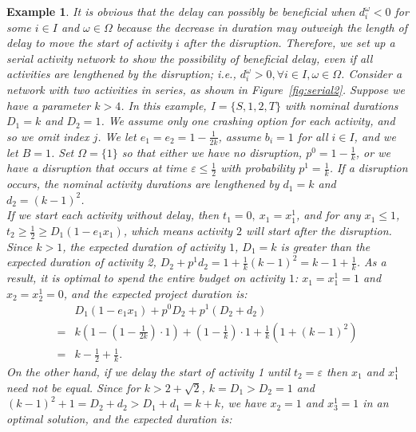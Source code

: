 \documentclass[11pt]{article}
\newtheorem{example}{Example}
\begin{document}
	\begin{example} \label{eg:delay}
		It is obvious that the delay can possibly be beneficial when \(d_i^\omega < 0\) for some \(i \in I\) and \(\omega \in \Omega\) because the decrease in duration may outweigh the length of delay to move the start of activity \(i\) after the disruption. Therefore, we set up a serial activity network to show the possibility of beneficial delay, even if all activities are lengthened by the disruption; i.e., \(d_i^\omega > 0, \forall i \in I, \omega \in \Omega\). Consider a network with two activities in series, as shown in Figure~\ref{fig:serial2}. Suppose we have a parameter \(k > 4\). In this example, $I=\{S,1,2,T\}$ with nominal durations $D_1 = k$ and $D_2 = 1$. We assume only one crashing option for each activity, and so we omit index $j$. We let $e_1=e_2=1 - \frac{1}{2k}$, assume $b_i=1$ for all $i \in I$, and we let $B=1$. Set $\Omega=\{1\}$ so that either we have no disruption, $p^0=1 - \frac{1}{k}$, or we have a disruption that occurs at time $\varepsilon \leq \frac{1}{2}$ with probability $p^1=\frac{1}{k}$. If a disruption occurs, the nominal activity durations are lengthened by $d_1 = k$ and $d_2 = (k - 1)^2$. \\
		\newline
		If we start each activity without delay, then \(t_1 = 0,\ x_1=x_1^1\), and for any \(x_1 \leq 1\), \(t_2 \geq \frac{1}{2} \geq D_1(1 - e_1 x_1) \), which means activity \(2\) will start after the disruption. Since \(k > 1\), the expected duration of activity \(1\), $D_1 = k$ is greater than the expected duration of activity 2, $ D_2 + p^1 d_2 = 1 + \frac{1}{k} (k-1)^2 = k - 1 + \frac{1}{k}$. As a result, it is optimal to spend the entire budget on activity \(1\): $x_1=x_1^1=1$ and $x_2=x_2^1=0$, and the expected project duration is: 
		\begin{subequations}
			\label{nodelay}
			\begin{align}
			&D_1 (1 - e_1 x_1) + p^0 D_2 + p^1 (D_2 + d_2) \\
			= & k \left(1 - (1 - \frac{1}{2k})\cdot 1 \right) + (1 - \frac{1}{k}) \cdot 1 + \frac{1}{k} \left(1 + (k -1)^2\right) \\
			= & k - \frac{1}{2} + \frac{1}{k}.
			\end{align} 
		\end{subequations}
		On the other hand, if we delay the start of activity 1 until $t_2= \varepsilon$ then $x_1$ and $x_1^1$ need not be equal. Since for \(k > 2 + \sqrt{2}\), $k = D_1 > D_2 = 1$ and $(k - 1)^2 + 1 = D_2+d_2 > D_1 + d_1 = k + k$, we have $x_2=1$ and $x_3^1=1$ in an optimal solution, and the expected duration is:

\end{example}
\end{document}
